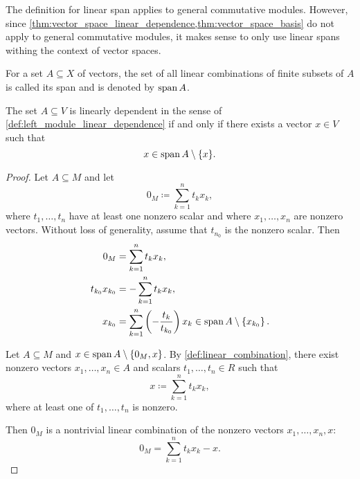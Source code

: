 \begin{remark}\label{remark:linear_span_only_for_vector_spaces}
  The definition for linear span applies to general commutative modules. However, since \cref{thm:vector_space_linear_dependence,thm:vector_space_basis} do not apply to general commutative modules, it makes sense to only use linear spans withing the context of vector spaces.
\end{remark}

\begin{definition}\label{def:linear_span}
  For a set \( A \subseteq X \) of vectors, the set of all linear combinations of finite subsets of \( A \) is called its span and is denoted by \( \operatorname{span}{A} \).
\end{definition}

\begin{proposition}\label{thm:vector_space_linear_dependence}
  The set \( A \subseteq V \) is linearly dependent in the sense of \cref{def:left_module_linear_dependence} if and only if there exists a vector \( x \in V \) such that
  \begin{equation*}
    x \in \operatorname{span}{A} \setminus \{ x \}.
  \end{equation*}
\end{proposition}
\begin{proof}
  \Implies Let \( A \subseteq M \) and let
  \begin{equation*}
    0_M \coloneqq \sum_{k=1}^n t_k x_k,
  \end{equation*}
  where \( t_1, \ldots, t_n \) have at least one nonzero scalar and where \( x_1, \ldots, x_n \) are nonzero vectors. Without loss of generality, assume that \( t_{n_0} \) is the nonzero scalar. Then
  \begin{align*}
    0_M &= \sum_{k=1}^n t_k x_k, \\
    t_{k_0} x_{k_0} &= -\sum_{k=1}^n t_k x_k, \\
    x_{k_0} &= \sum_{k=1}^n \left(-\frac {t_k} {t_{k_0}} \right) x_k \in \operatorname{span}{A} \setminus \left\{ x_{k_0} \right\}.
  \end{align*}

  \ImpliedBy Let \( A \subseteq M \) and \( x \in \operatorname{span}{A} \setminus \{ 0_M, x \} \). By \cref{def:linear_combination}, there exist nonzero vectors \( x_1, \ldots, x_n \in A \) and scalars \( t_1, \ldots, t_n \in R \) such that
  \begin{equation*}
    x \coloneqq \sum_{k=1}^n t_k x_k,
  \end{equation*}
  where at least one of \( t_1, \ldots, t_n \) is nonzero.

  Then \( 0_M \) is a nontrivial linear combination of the nonzero vectors \( x_1, \ldots, x_n, x \):
  \begin{equation*}
    0_M = \sum_{k=1}^n t_k x_k - x.
  \end{equation*}
\end{proof}

